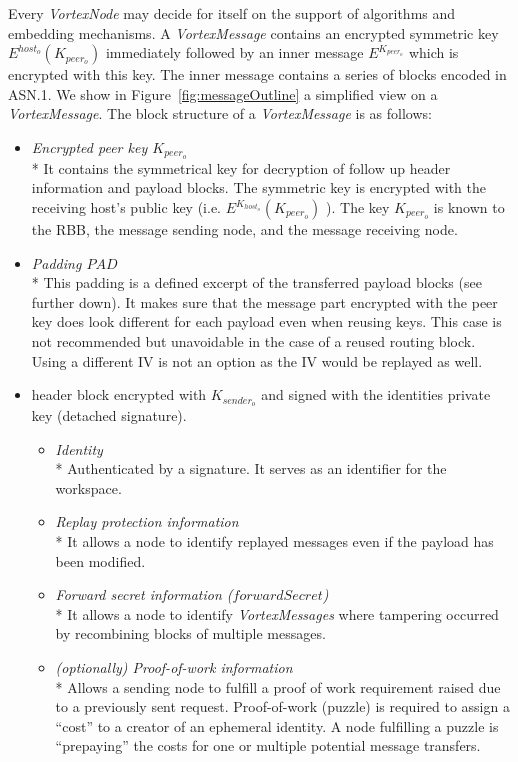\documentclass[acmsmall, screen, review]{acmart}
\begin{document}
Every \emph{VortexNode} may decide for itself on the support of algorithms and embedding mechanisms. A \emph{VortexMessage} contains an encrypted symmetric key $E^{host_o}\left(K_{peer_o}\right)$ immediately followed by an inner message $E^{K_{peer_o}}$ which is encrypted with this key. The inner message contains a series of blocks encoded in ASN.1. We show in Figure~\ref{fig:messageOutline} a simplified view on a \emph{VortexMessage}. The block structure of a \emph{VortexMessage} is as follows:
\begin{itemize}
	\item \emph{Encrypted peer key $K_{peer_o}$}\\*
	It contains the symmetrical key for decryption of follow up header information and payload blocks. The symmetric key is encrypted with the receiving host's public key (i.e. $E^{K_{host_o}}\left(K_{peer_o}\right)$ ). The key $K_{peer_o}$ is known to the RBB, the message sending node, and the message receiving node.
	\item \emph{Padding $PAD$}\\*
	This padding is a defined excerpt of the transferred payload blocks (see further down). It makes sure that the message part encrypted with the peer key does look different for each payload even when reusing keys. This case is not recommended but unavoidable in the case of a reused routing block. Using a different IV is not an option as the IV would be replayed as well.
	\item header block encrypted with $K_{sender_o}$ and signed with the identities private key (detached signature).
	\begin{itemize}
		\item \emph{Identity}\\*
		Authenticated by a signature. It serves as an identifier for the workspace.
		\item \emph{Replay protection information}\\*
		It allows a node to identify replayed messages even if the payload has been modified.
		\item \emph{Forward secret information ($forwardSecret$)}\\*
		It allows a node to identify \emph{VortexMessages} where tampering occurred by recombining blocks of multiple messages.      
		\item \emph{(optionally) Proof-of-work information}\\*
		Allows a sending node to fulfill a proof of work requirement raised due to a previously sent request. Proof-of-work (puzzle) is required to assign a ``cost'' to a creator of an ephemeral identity. A node fulfilling a puzzle is ``prepaying'' the costs for one or multiple potential message transfers. 

\end{itemize}
\end{itemize}
\end{document}
